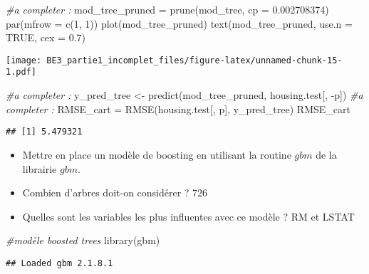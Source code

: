 \documentclass[
]{article}
\newenvironment{Shaded}{\begin{snugshade}}{\end{snugshade}}
\newcommand{\AttributeTok}[1]{\textcolor[rgb]{0.77,0.63,0.00}{#1}}
\newcommand{\CommentTok}[1]{\textcolor[rgb]{0.56,0.35,0.01}{\textit{#1}}}
\newcommand{\ConstantTok}[1]{\textcolor[rgb]{0.00,0.00,0.00}{#1}}
\newcommand{\DecValTok}[1]{\textcolor[rgb]{0.00,0.00,0.81}{#1}}
\newcommand{\FloatTok}[1]{\textcolor[rgb]{0.00,0.00,0.81}{#1}}
\newcommand{\FunctionTok}[1]{\textcolor[rgb]{0.00,0.00,0.00}{#1}}
\newcommand{\NormalTok}[1]{#1}
\newcommand{\OtherTok}[1]{\textcolor[rgb]{0.56,0.35,0.01}{#1}}
\newcommand{\SpecialCharTok}[1]{\textcolor[rgb]{0.00,0.00,0.00}{#1}}
\providecommand{\tightlist}{%
  \setlength{\itemsep}{0pt}\setlength{\parskip}{0pt}}
\begin{document}
\begin{Shaded}
\begin{Highlighting}[]
\CommentTok{\#a completer :}
\NormalTok{mod\_tree\_pruned }\OtherTok{=} \FunctionTok{prune}\NormalTok{(mod\_tree, }\AttributeTok{cp =} \FloatTok{0.002708374}\NormalTok{)}
\FunctionTok{par}\NormalTok{(}\AttributeTok{mfrow =} \FunctionTok{c}\NormalTok{(}\DecValTok{1}\NormalTok{, }\DecValTok{1}\NormalTok{))}
\FunctionTok{plot}\NormalTok{(mod\_tree\_pruned)}
\FunctionTok{text}\NormalTok{(mod\_tree\_pruned, }\AttributeTok{use.n =} \ConstantTok{TRUE}\NormalTok{, }\AttributeTok{cex =} \FloatTok{0.7}\NormalTok{)}
\end{Highlighting}
\end{Shaded}

\texttt{[image: BE3\_partie1\_incomplet\_files/figure-latex/unnamed-chunk-15-1.pdf]}

\begin{Shaded}
\begin{Highlighting}[]
\CommentTok{\#a completer :}
\NormalTok{y\_pred\_tree }\OtherTok{\textless{}{-}} \FunctionTok{predict}\NormalTok{(mod\_tree\_pruned, housing.test[, }\SpecialCharTok{{-}}\NormalTok{p])}
\CommentTok{\#a completer :}
\NormalTok{RMSE\_cart }\OtherTok{=} \FunctionTok{RMSE}\NormalTok{(housing.test[, p], y\_pred\_tree)}
\NormalTok{RMSE\_cart}
\end{Highlighting}
\end{Shaded}

\begin{verbatim}
## [1] 5.479321
\end{verbatim}

\begin{itemize}
\tightlist
\item
  Mettre en place un modèle de boosting en utilisant la routine \(gbm\)
  de la librairie \(gbm\).
\item
  Combien d'arbres doit-on considérer ? 726
\item
  Quelles sont les variables les plus influentes avec ce modèle ? RM et
  LSTAT
\end{itemize}

\begin{Shaded}
\begin{Highlighting}[]
\CommentTok{\#modèle boosted trees}
\FunctionTok{library}\NormalTok{(gbm)}
\end{Highlighting}
\end{Shaded}

\begin{verbatim}
## Loaded gbm 2.1.8.1
\end{verbatim}
\end{document}
